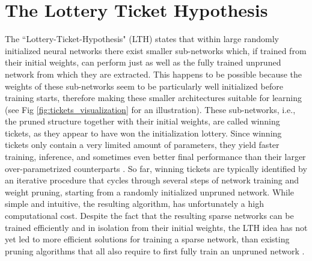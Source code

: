 \section{The Lottery Ticket Hypothesis}
\label{sec:intro}
The ``Lottery-Ticket-Hypothesis" (LTH) \cite{frankle2018lottery} states that within large randomly initialized neural networks there exist smaller sub-networks which, if trained from their initial weights, can perform just as well as the fully trained unpruned network from which they are extracted. This happens to be possible because the weights of these sub-networks seem to be particularly well initialized before training starts, therefore making these smaller architectures suitable for learning (see Fig \ref{fig:tickets_visualization} for an illustration). These sub-networks, i.e., the pruned structure together with their initial weights, are called winning tickets, as they appear to have won the initialization lottery. Since winning tickets only contain a very limited amount of parameters, they yield faster training, inference, and sometimes even better final performance than their larger over-parametrized counterparts \cite{frankle2018lottery,franklestabilizing}. So far, winning tickets are typically identified by an iterative procedure that cycles through several steps of network training and weight pruning, starting from a randomly initialized unpruned network. While simple and intuitive, the resulting algorithm, has unfortunately a high computational cost. Despite the fact that the resulting sparse networks can be trained efficiently and in isolation from their initial weights, the LTH idea has not yet led to more efficient solutions for training a sparse network, than existing pruning algorithms that all also require to first fully train an unpruned network \cite{han2015deep,molchanov2016pruning,dong2017learning,lin2017runtime,zhuang2018discrimination}.

